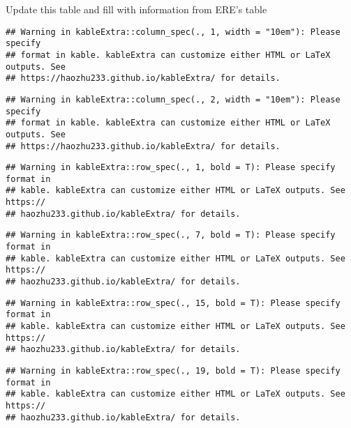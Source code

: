 \documentclass[]{article}
\title{}
\author{}
\date{}
\begin{document}
Update this table and fill with information from ERE's table

\begin{verbatim}
## Warning in kableExtra::column_spec(., 1, width = "10em"): Please specify
## format in kable. kableExtra can customize either HTML or LaTeX outputs. See
## https://haozhu233.github.io/kableExtra/ for details.
\end{verbatim}

\begin{verbatim}
## Warning in kableExtra::column_spec(., 2, width = "10em"): Please specify
## format in kable. kableExtra can customize either HTML or LaTeX outputs. See
## https://haozhu233.github.io/kableExtra/ for details.
\end{verbatim}

\begin{verbatim}
## Warning in kableExtra::row_spec(., 1, bold = T): Please specify format in
## kable. kableExtra can customize either HTML or LaTeX outputs. See https://
## haozhu233.github.io/kableExtra/ for details.
\end{verbatim}

\begin{verbatim}
## Warning in kableExtra::row_spec(., 7, bold = T): Please specify format in
## kable. kableExtra can customize either HTML or LaTeX outputs. See https://
## haozhu233.github.io/kableExtra/ for details.
\end{verbatim}

\begin{verbatim}
## Warning in kableExtra::row_spec(., 15, bold = T): Please specify format in
## kable. kableExtra can customize either HTML or LaTeX outputs. See https://
## haozhu233.github.io/kableExtra/ for details.
\end{verbatim}

\begin{verbatim}
## Warning in kableExtra::row_spec(., 19, bold = T): Please specify format in
## kable. kableExtra can customize either HTML or LaTeX outputs. See https://
## haozhu233.github.io/kableExtra/ for details.
\end{verbatim}
\end{document}
